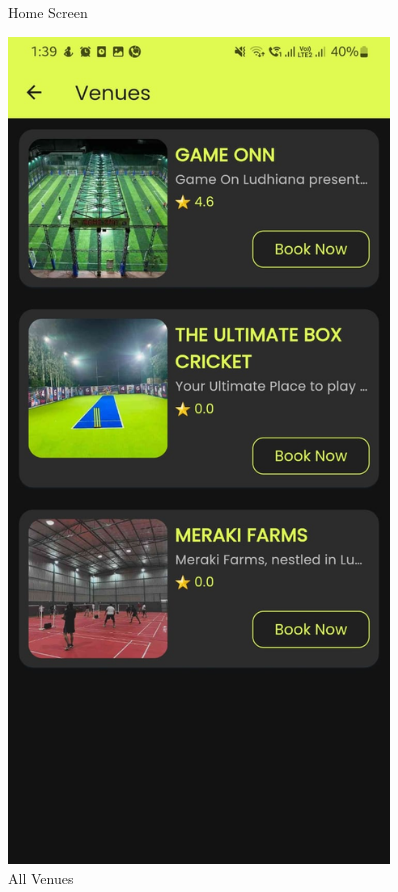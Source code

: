 \documentclass[12pt,a4paper]{report}
\begin{document}
\begin{figure}[H]
\begin{minipage}[t]{0.3\textwidth}
        \caption{Home Screen}
    \end{minipage}%
    \hfill
    \begin{minipage}[t]{0.3\textwidth}
        \centering
        \includegraphics[width=0.9\textwidth]{assets/screenshot2.jpeg}
        \caption{All Venues}
    \end{minipage}

\end{figure}
\end{document}
